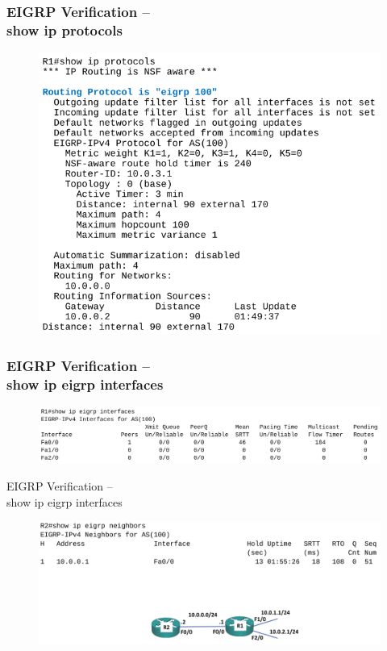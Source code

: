 \documentclass[pdflatex,compress,mathserif]{beamer}
\begin{document}
\begin{frame}
	\frametitle{EIGRP Verification –\\ show ip protocols}
	\begin{figure}
		\centering
		\includegraphics[height=0.8\textheight]{img/img24}
	\end{figure}
\end{frame}

\begin{frame}
	\frametitle{EIGRP Verification –\\ show ip eigrp interfaces}
	\begin{figure}
		\centering
		\includegraphics[width=\linewidth]{img/img25}
	\end{figure}
\end{frame}

\begin{frame}{EIGRP Verification –\\ show ip eigrp interfaces}
	\begin{figure}
		\centering
		\includegraphics[width=\linewidth]{img/img26}
	\end{figure}
\end{frame}
\end{document}
